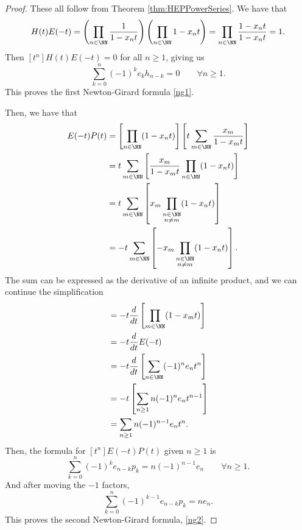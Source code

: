 \documentclass{article}
\begin{document}
\begin{proof}
    These all follow from Theorem \ref{thm:HEPPowerSeries}. We have that
    \[
        H(t)E(-t) 
        = \left(\prod_{n\in\NN}\frac{1}{1-x_nt}\right)\left(\prod_{n\in\NN}1-x_nt\right) 
        = \prod_{n\in\NN}\frac{1-x_nt}{1-x_nt} = 1.
    \]
    Then $[t^n] H(t)E(-t) = 0$ for all $n \geq 1$, giving us
    \[
        \sum_{k=0}^n (-1)^k e_k h_{n-k} = 0 \qquad \forall n\geq 1.
    \]
    This proves the first Newton-Girard formula \eqref{ng1}.

    Then, we have that
    \begin{align*}
        E(-t)P(t) &= \left[\prod_{n\in\NN}(1-x_nt)\right]\left[t\sum_{m\in\NN}\frac{x_m}{1-x_mt}\right] \\
                  &= t\sum_{m\in\NN}\left[\frac{x_m}{1-x_mt}\prod_{n\in\NN}(1-x_nt)\right] \\
                  &= t\sum_{m\in\NN} \left[x_m\prod_{\substack{n\in\NN \\ n\neq m}}(1-x_nt)\right] \\
                  &= -t\sum_{m\in\NN} \left[-x_m\prod_{\substack{n\in\NN \\ n\neq m}}(1-x_nt)\right].
    \end{align*}
    The sum can be expressed as the derivative of an infinite product, and we can continue the simplification
    \begin{align*}
                  &= -t\frac{d}{dt}\left[\prod_{m\in\NN}(1-x_mt)\right] \\
                  &= -t\frac{d}{dt}E(-t) \\
                  &= -t\frac{d}{dt}\left[\sum_{n\in\NN}(-1)^n e_nt^n\right] \\
                  &= -t\left[\sum_{n\geq 1}n(-1)^n e_nt^{n-1}\right] \\
                  &= \sum_{n\geq 1}n(-1)^{n-1} e_nt^n.
    \end{align*}
    Then, the formula for $[t^n]E(-t)P(t)$ given $n \geq 1$ is
    \[
        \sum_{k=0}^n (-1)^k e_{n-k}p_k = n(-1)^{n-1}e_n \qquad \forall n \geq 1.
    \]
    And after moving the $-1$ factors,
    \[
        \sum_{k=0}^n (-1)^{k-1} e_{n-k}p_k = ne_n.
    \]
    This proves the second Newton-Girard formula, \eqref{ng2}.


\end{proof}
\end{document}
